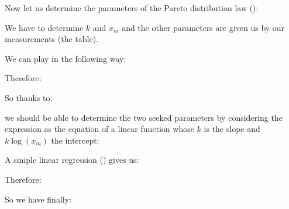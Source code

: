 	Now let us determine the parameters of the Pareto distribution law ():
	
We have to determine $k$ and $x_m$ and the other parameters are given us by our measurements (the table).

	We can play in the following way:
	
	Therefore:
	
	So thanks to:
	
	we should be able to determine the two seeked parameters by considering the expression as the equation of a linear function whose $k$ is the slope and $k\log(x_m)$ the intercept:
	
	A simple linear regression () gives us:
	
	Therefore:
	
	So we have finally:
	
